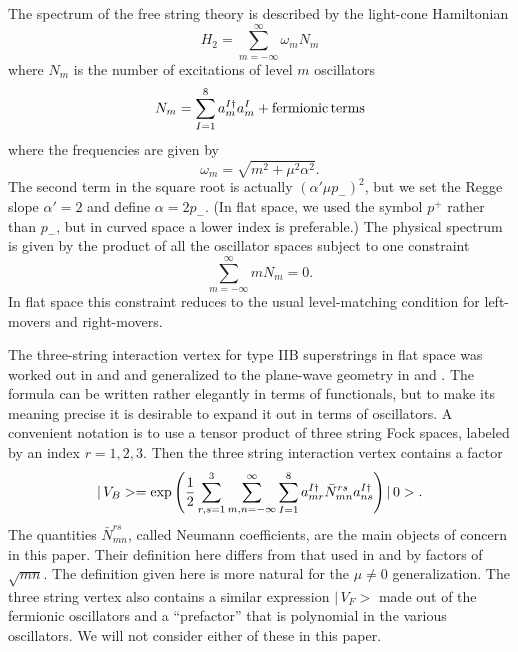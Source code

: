 \documentclass[a4paper,12pt]{article}
\begin{document}
The spectrum of the free string theory is described by the
light-cone Hamiltonian
\begin{equation}
H_2 = \sum_{m= -\infty}^{\infty} \omega_m N_m
\end{equation}
where $N_m$ is the number of excitations of level $m$ oscillators
\begin{equation}
N_m = \sum_{I=1}^8 a_m^{I \dagger} a_m^I + {\rm fermionic\, terms}
\end{equation}
where the frequencies are given by
\begin{equation}
\omega_m = \sqrt{m^2 + \mu^2 \alpha^2}.
\end{equation}
The second term in the square root is actually $(\alpha' \mu
p_-)^2$, but we set the Regge slope $\alpha'=2$ and define $\alpha
= 2 p_-$. (In flat space, we used the symbol $p^+$ rather than
$p_-$, but in curved space a lower index is preferable.) The
physical spectrum is given by the product of all the oscillator
spaces subject to one constraint
\begin{equation}
\sum_{m= -\infty}^{\infty} m N_m =0.
\end{equation}
In flat space this constraint reduces to the usual level-matching
condition for left-movers and right-movers.

The three-string interaction vertex for type IIB superstrings in
flat space was worked out in \cite{Green:1982tc} and
\cite{Green:hw} and generalized to the plane-wave geometry in
\cite{Spradlin:2002ar} and \cite{Spradlin:2002rv}. The formula can
be written rather elegantly in terms of functionals, but to make
its meaning precise it is desirable to expand it out in terms of
oscillators. A convenient notation is to use a tensor product of
three string Fock spaces, labeled by an index $r=1,2,3$. Then the
three string interaction vertex contains a factor
\begin{equation}
|\, V_B> = {\rm exp} \left( {1\over 2} \sum_{r,s =1}^3 \sum_{m,n
=-\infty}^{\infty} \sum_{I=1}^8 a_{mr}^{I\dagger} \bar N_{mn}^{rs}
a_{ns}^{I\dagger}\right) |\, 0>.
\end{equation}
The quantities $\bar N_{mn}^{rs}$, called Neumann coefficients,
are the main objects of concern in this paper. Their definition
here differs from that used in \cite{Green:1982tc} and
\cite{Green:hw} by factors of $\sqrt{m n}$. The definition given
here is more natural for the $\mu\neq 0$ generalization. The three
string vertex also contains a similar expression $|\, V_F>$ made
out of the fermionic oscillators and a ``prefactor'' that is
polynomial in the various oscillators. We will not consider either
of these in this paper.
\end{document}
